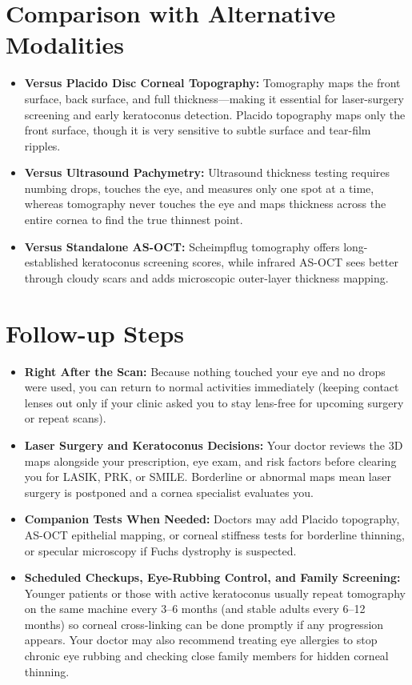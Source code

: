 \section{Comparison with Alternative Modalities}
\begin{itemize}
    \item \textbf{Versus Placido Disc Corneal Topography:} Tomography maps the front surface, back surface, and full thickness---making it essential for laser-surgery screening and early keratoconus detection. Placido topography maps only the front surface, though it is very sensitive to subtle surface and tear-film ripples.
    \item \textbf{Versus Ultrasound Pachymetry:} Ultrasound thickness testing requires numbing drops, touches the eye, and measures only one spot at a time, whereas tomography never touches the eye and maps thickness across the entire cornea to find the true thinnest point.
    \item \textbf{Versus Standalone AS-OCT:} Scheimpflug tomography offers long-established keratoconus screening scores, while infrared AS-OCT sees better through cloudy scars and adds microscopic outer-layer thickness mapping.
\end{itemize}

\section{Follow-up Steps}
\begin{itemize}
    \item \textbf{Right After the Scan:} Because nothing touched your eye and no drops were used, you can return to normal activities immediately (keeping contact lenses out only if your clinic asked you to stay lens-free for upcoming surgery or repeat scans).
    \item \textbf{Laser Surgery and Keratoconus Decisions:} Your doctor reviews the 3D maps alongside your prescription, eye exam, and risk factors before clearing you for LASIK, PRK, or SMILE. Borderline or abnormal maps mean laser surgery is postponed and a cornea specialist evaluates you.
    \item \textbf{Companion Tests When Needed:} Doctors may add Placido topography, AS-OCT epithelial mapping, or corneal stiffness tests for borderline thinning, or specular microscopy if Fuchs dystrophy is suspected.
    \item \textbf{Scheduled Checkups, Eye-Rubbing Control, and Family Screening:} Younger patients or those with active keratoconus usually repeat tomography on the same machine every 3--6 months (and stable adults every 6--12 months) so corneal cross-linking can be done promptly if any progression appears. Your doctor may also recommend treating eye allergies to stop chronic eye rubbing and checking close family members for hidden corneal thinning.
\end{itemize}

